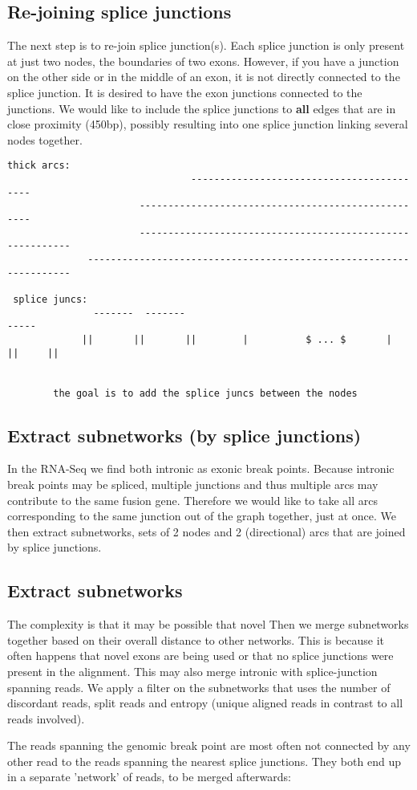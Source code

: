 \documentclass{article}
\theoremstyle{definition}
\begin{document}
\subsection{Re-joining splice junctions}
The next step is to re-join splice junction(s).
Each splice junction is only present at just two nodes, the boundaries of two exons.
However, if you have a junction on the other side or in the middle of an exon, it is not directly connected to the splice junction.
It is desired to have the exon junctions connected to the junctions.
We would like to include the splice junctions to \textbf{all} edges that are in close proximity (450bp), possibly resulting into one splice junction linking several nodes together.

\begin{verbatim}
thick arcs:
                                ------------------------------------------
                       ---------------------------------------------------
                       ----------------------------------------------------------
              -------------------------------------------------------------------

 splice juncs:
               -------  -------                                            -----
             ||       ||       ||        |          $ ... $       |      ||     ||

        
        the goal is to add the splice juncs between the nodes
\end{verbatim}


\subsection{Extract subnetworks (by splice junctions)}
In the RNA-Seq we find both intronic as exonic break points.
Because intronic break points may be spliced, multiple junctions and thus multiple arcs may contribute to the same fusion gene.
Therefore we would like to take all arcs corresponding to the same junction out of the graph together, just at once.
We then extract subnetworks, sets of 2 nodes and 2 (directional) arcs that are joined by splice junctions.

\subsection{Extract subnetworks}
The complexity is that it may be possible that novel 
Then we merge subnetworks together based on their overall distance to other networks.
This is because it often happens that novel exons are being used or that no splice junctions were present in the alignment.
This may also merge intronic with splice-junction spanning reads.
We apply a filter on the subnetworks that uses the number of discordant reads, split reads and entropy (unique aligned reads in contrast to all reads involved).

The reads spanning the genomic break point are most often not connected by any other read to the reads spanning the nearest splice junctions.
They both end up in a separate 'network' of reads, to be merged afterwards:
\end{document}
